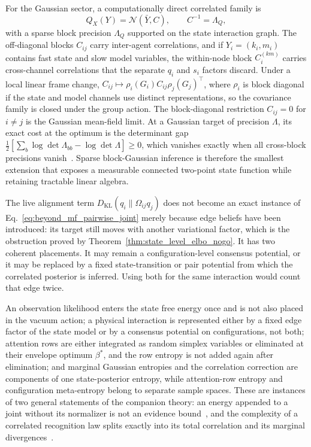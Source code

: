 For the Gaussian sector, a computationally direct correlated family is
\begin{equation}
Q_X(Y)=\mathcal{N}(\bar{Y},C),
\qquad
C^{-1}=\Lambda_Q,
\label{eq:beyond_mf_block_gaussian}
\end{equation}
with a sparse block precision $\Lambda_Q$ supported on the state interaction graph. The off-diagonal blocks $C_{ij}$ carry inter-agent correlations, and if $Y_i=(k_i,m_i)$ contains fast state and slow model variables, the within-node block $C_i^{(km)}$ carries cross-channel correlations that the separate $q_i$ and $s_i$ factors discard. Under a local linear frame change, $C_{ij}\mapsto \rho_i(G_i)C_{ij}\rho_j(G_j)^\top$, where $\rho_i$ is block diagonal if the state and model channels use distinct representations, so the covariance family is closed under the group action. The block-diagonal restriction $C_{ij}=0$ for $i\ne j$ is the Gaussian mean-field limit. At a Gaussian target of precision $\Lambda$, its exact cost at the optimum is the determinant gap $\frac12[\sum_b\log\det\Lambda_{bb}-\log\det\Lambda]\ge0$, which vanishes exactly when all cross-block precisions vanish~\cite[Ch.~G4]{DennisGaugeVFESuppG2026}. Sparse block-Gaussian inference is therefore the smallest extension that exposes a measurable connected two-point state function while retaining tractable linear algebra.

The live alignment term $D_{\mathrm{KL}}(q_i\|\Omega_{ij}q_j)$ does not become an exact instance of Eq.~\eqref{eq:beyond_mf_pairwise_joint} merely because edge beliefs have been introduced: its target still moves with another variational factor, which is the obstruction proved by Theorem~\ref{thm:state_level_elbo_nogo}. It has two coherent placements. It may remain a configuration-level consensus potential, or it may be replaced by a fixed state-transition or pair potential from which the correlated posterior is inferred. Using both for the same interaction would count that edge twice.

\begin{remark}
\label{rem:beyond_mf_no_double_counting}
An observation likelihood enters the state free energy once and is not also placed in the vacuum action; a physical interaction is represented either by a fixed edge factor of the state model or by a consensus potential on configurations, not both; attention rows are either integrated as random simplex variables or eliminated at their envelope optimum $\beta^*$, and the row entropy is not added again after elimination; and marginal Gaussian entropies and the correlation correction are components of one state-posterior entropy, while attention-row entropy and configuration meta-entropy belong to separate sample spaces. These are instances of two general statements of the companion theory: an energy appended to a joint without its normalizer is not an evidence bound~\cite[Ch.~4]{DennisGaugeVFE2026}, and the complexity of a correlated recognition law splits exactly into its total correlation and its marginal divergences~\cite[Ch.~5]{DennisGaugeVFE2026}.
\end{remark}

